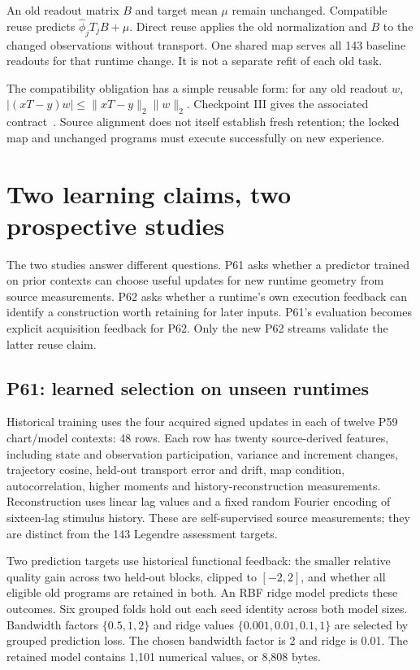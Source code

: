 \documentclass[11pt]{article}
\begin{document}
An old readout matrix $B$ and target mean $\mu$ remain unchanged. Compatible reuse predicts $\widehat\phi_j T_jB+\mu$. Direct reuse applies the old normalization and $B$ to the changed observations without transport. One shared map serves all 143 baseline readouts for that runtime change. It is not a separate refit of each old task.

The compatibility obligation has a simple reusable form: for any old readout $w$, $|(xT-y)w|\leq\|xT-y\|_2\|w\|_2$. Checkpoint III gives the associated contract~\cite{sg3}. Source alignment does not itself establish fresh retention; the locked map and unchanged programs must execute successfully on new experience.

\section{Two learning claims, two prospective studies}
The two studies answer different questions. P61 asks whether a predictor trained on prior contexts can choose useful updates for new runtime geometry from source measurements. P62 asks whether a runtime's own execution feedback can identify a construction worth retaining for later inputs. P61's evaluation becomes explicit acquisition feedback for P62. Only the new P62 streams validate the latter reuse claim.

\subsection{P61: learned selection on unseen runtimes}
Historical training uses the four acquired signed updates in each of twelve P59 chart/model contexts: 48 rows. Each row has twenty source-derived features, including state and observation participation, variance and increment changes, trajectory cosine, held-out transport error and drift, map condition, autocorrelation, higher moments and history-reconstruction measurements. Reconstruction uses linear lag values and a fixed random Fourier encoding of sixteen-lag stimulus history. These are self-supervised source measurements; they are distinct from the 143 Legendre assessment targets.

Two prediction targets use historical functional feedback: the smaller relative quality gain across two held-out blocks, clipped to $[-2,2]$, and whether all eligible old programs are retained in both. An RBF ridge model predicts these outcomes. Six grouped folds hold out each seed identity across both model sizes. Bandwidth factors $\{0.5,1,2\}$ and ridge values $\{0.001,0.01,0.1,1\}$ are selected by grouped prediction loss. The chosen bandwidth factor is 2 and ridge is 0.01. The retained model contains 1,101 numerical values, or 8,808 bytes.
\end{document}
